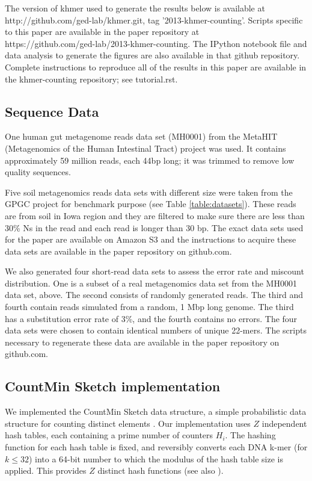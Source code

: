 \documentclass[10pt]{article}
\begin{document}

The version of khmer used to generate the results below is available
at http://github.com/ged-lab/khmer.git, tag '2013-khmer-counting'.
Scripts specific to this paper are available in the paper repository
at \\
https://github.com/ged-lab/2013-khmer-counting.
The IPython\cite{4160251} notebook file and data analysis to generate the figures are also
available in that github repository.  Complete instructions to reproduce
all of the results in this paper are available in the khmer-counting
repository; see tutorial.rst.

\subsection*{Sequence Data}

One human gut metagenome reads data set (MH0001) from the 
MetaHIT (Metagenomics of the Human Intestinal Tract) project \cite{Qin2010} was used. 
It contains approximately 59 million reads, each 44bp long; it was trimmed to remove 
low quality sequences. 

Five soil metagenomics reads data sets with different size were taken
from the GPGC project for benchmark purpose (see Table
\ref{table:datasets}).  These reads are from soil in Iowa region and they
are filtered to make sure there are less than 30\% Ns in the read and
each read is longer than 30 bp.  The exact data sets used for the
paper are available on Amazon S3 and the instructions to acquire these
data sets are available in the paper repository on github.com.

We also generated four short-read data sets to assess the error
rate and miscount distribution. One is a subset of a real
metagenomics data set from the MH0001 data set, above. The second
consists of randomly generated reads. The third and fourth contain
reads simulated from a random, 1 Mbp long genome.  The third has a
substitution error rate of 3\%, and the fourth contains no errors. The
four data sets were chosen to contain identical numbers of unique
22-mers.  The scripts necessary to regenerate these data are available
in the paper repository on github.com.

\subsection*{CountMin Sketch implementation}

We implemented the CountMin Sketch data structure, a simple
probabilistic data structure for counting distinct elements
\cite{Cormode2005}.  Our implementation uses $Z$ independent hash
tables, each containing a prime number of counters $H_i$.  The hashing
function for each hash table is fixed, and reversibly converts each
DNA k-mer (for $k \le 32$) into a 64-bit number to which the modulus of
the hash table size is applied.  This provides $Z$ distinct hash
functions (see also \cite{adina2013}).
\end{document}
